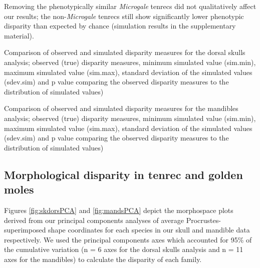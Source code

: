 \documentclass[12pt,a4paper]{article}
\begin{document}

Removing the phenotypically similar \textit{Microgale} tenrecs did not qualitatively affect our results; the non-\textit{Microgale} tenrecs still show significantly lower phenotypic disparity than expected by chance (simulation results in the supplementary material). 


\begin{table}[H]				

\centering
\caption{Comparison of observed and simulated disparity measures for the dorsal skulls analysis; observed (true) disparity measures, minimum simulated value (sim.min), maximum simulated value (sim.max), standard deviation of the simulated values (sdev.sim) and p value comparing the observed disparity measures to the distribution of simulated values)}


\label{tab:skdors_sims} %
\end{table}

\begin{table}[H]				

\centering
\caption{Comparison of observed and simulated disparity measures for the mandibles analysis; observed (true) disparity measures, minimum simulated value (sim.min), maximum simulated value (sim.max), standard deviation of the simulated values (sdev.sim) and p value comparing the observed disparity measures to the distribution of simulated values)}


\label{tab:mands_sims}
\end{table}

\subsection{Morphological disparity in tenrec and golden moles} 

Figures  \ref{fig:skdorsPCA} and \ref{fig:mandsPCA} depict the morphospace plots derived from our principal components analyses of average Procrustes-superimposed shape coordinates for each species in our skull and mandible data respectively. We used the principal components axes which accounted for 95\% of the cumulative variation (n = 6 axes for the dorsal skulls analysis and n = 11 axes for the mandibles) to calculate the disparity of each family. 
\end{document}
